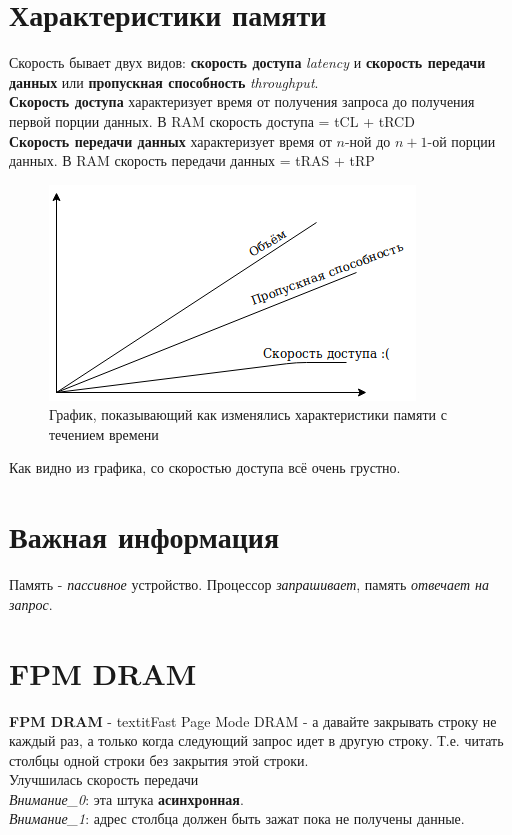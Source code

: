 \documentclass[12pt, a4paper]{article}
\begin{document}
\section{Характеристики памяти}
Скорость бывает двух видов: \textbf{скорость доступа} \textit{latency} и \textbf{скорость передачи данных} или \textbf{пропускная способность} \textit{throughput}.\\
\textbf{Скорость доступа} характеризует время от получения запроса до получения первой порции данных. В RAM скорость доступа = tCL + tRCD\\
\textbf{Скорость передачи данных} характеризует время от $n$-ной до $n+1$-ой порции данных. В RAM скорость передачи данных = tRAS + tRP\\
\begin{figure}[h]
    \centering
    \includegraphics[scale=0.4]{./images/graphic.png}
    \caption{График, показывающий как изменялись характеристики памяти с течением времени}
    \label{fig:SDR_SDRAM}
\end{figure}
Как видно из графика, со скоростью доступа всё очень грустно.
\section{Важная информация}
Память - \textit{пассивное} устройство. Процессор \textit{запрашивает}, память \textit{отвечает на запрос}.
\section{FPM DRAM}
\textbf{FPM DRAM} - textit{Fast Page Mode DRAM} - а давайте закрывать строку не каждый раз, а только когда следующий запрос идет в другую строку. Т.е. читать столбцы одной строки без закрытия этой строки.\\
Улучшилась скорость передачи\\
\textit{Внимание\_0}: эта штука \textbf{асинхронная}.\\
\textit{Внимание\_1}: адрес столбца должен быть зажат пока не получены данные.
\end{document}
